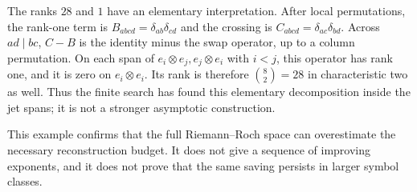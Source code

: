 The ranks $28$ and $1$ have an elementary interpretation.
After local permutations, the rank-one term is
$B_{abcd}=\delta_{ab}\delta_{cd}$ and the crossing is
$C_{abcd}=\delta_{ac}\delta_{bd}$. Across $ad\mid bc$,
$C-B$ is the identity minus the swap operator, up to a column
permutation. On each span of $e_i\otimes e_j,e_j\otimes e_i$
with $i<j$, this operator has rank one, and it is zero on
$e_i\otimes e_i$. Its rank is therefore $\binom82=28$ in
characteristic two as well. Thus the finite search has found
this elementary decomposition inside the jet spans; it is
not a stronger asymptotic construction.

This example confirms that the full Riemann--Roch space can
overestimate the necessary reconstruction budget. It does not
give a sequence of improving exponents, and it does not prove
that the same saving persists in larger symbol classes.
